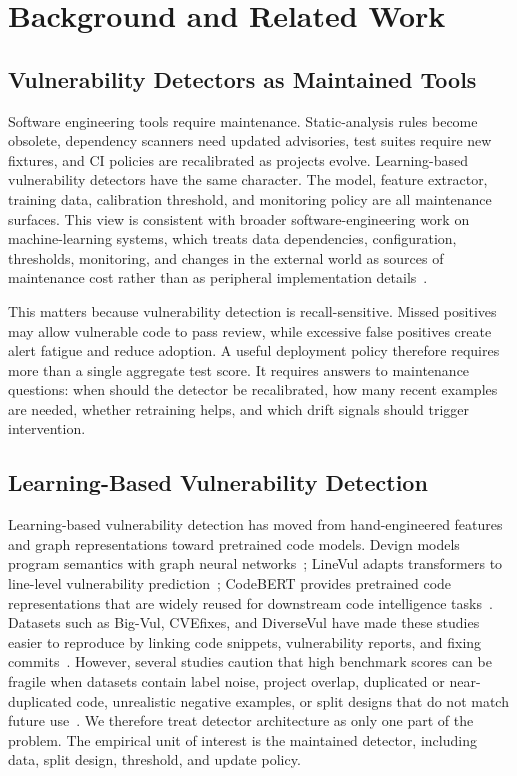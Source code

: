 \documentclass[a4paper,fleqn]{cas-dc}
\begin{document}
\section{Background and Related Work}

\subsection{Vulnerability Detectors as Maintained Tools}

Software engineering tools require maintenance. Static-analysis rules become
obsolete, dependency scanners need updated advisories, test suites require new
fixtures, and CI policies are recalibrated as projects evolve. Learning-based
vulnerability detectors have the same character. The model, feature extractor,
training data, calibration threshold, and monitoring policy are all maintenance
surfaces. This view is consistent with broader software-engineering work on
machine-learning systems, which treats data dependencies, configuration,
thresholds, monitoring, and changes in the external world as sources of
maintenance cost rather than as peripheral implementation
details~\cite{sculley2015debt,amershi2019seml}.

This matters because vulnerability detection is recall-sensitive. Missed
positives may allow vulnerable code to pass review, while excessive false
positives create alert fatigue and reduce adoption. A useful deployment policy
therefore requires more than a single aggregate test score. It requires answers
to maintenance questions: when should the detector be recalibrated, how many
recent examples are needed, whether retraining helps, and which drift signals
should trigger intervention.

\subsection{Learning-Based Vulnerability Detection}

Learning-based vulnerability detection has moved from hand-engineered features
and graph representations toward pretrained code models. Devign models program
semantics with graph neural networks~\cite{zhou2019devign}; LineVul adapts
transformers to line-level vulnerability prediction~\cite{fu2022linevul};
CodeBERT provides pretrained code representations that are widely reused for
downstream code intelligence tasks~\cite{feng2020codebert}. Datasets such as
Big-Vul, CVEfixes, and DiverseVul have made these studies easier to reproduce by
linking code snippets, vulnerability reports, and fixing
commits~\cite{fan2020bigvul,bhandari2021cvefixes,chen2023diversevul}. However,
several studies caution that high benchmark scores can be fragile when
datasets contain label noise, project overlap, duplicated or near-duplicated
code, unrealistic negative examples, or split designs that do not match future
use~\cite{jimenez2016vulnerability,croft2023dataquality,
chakraborty2022reveal,nguyen2022regvd,steenhoek2023empirical,
risse2024limits,chen2023diversevul}. We therefore treat detector architecture
as only one part of the problem. The empirical unit of interest is the
maintained detector, including data, split design, threshold, and update policy.
\end{document}
